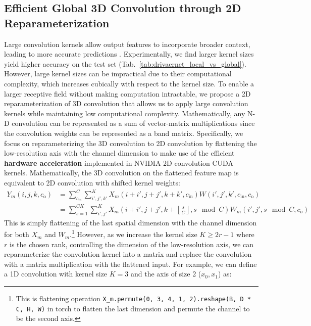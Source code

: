 \subsection{Efficient Global 3D Convolution through 2D Reparameterization}
\label{sec:reparameterization}

Large convolution kernels allow output features to incorporate broader context, leading to more accurate predictions \citep{peng2017large,huang2023large}.
Experimentally, we find larger kernel sizes yield higher accuracy on the test set (Tab.~\ref{tab:drivaernet_local_vs_global}).
However, large kernel sizes can be impractical due to their computational complexity, which increases cubically with respect to the kernel size.
To enable a larger receptive field without making computation intractable, we propose a 2D reparameterization of 3D convolution that allows us to apply large convolution kernels while maintaining low computational complexity.
Mathematically, any N-D convolution can be represented as a sum of vector-matrix multiplications since the convolution weights can be represented as a band matrix.
Specifically, we focus on reparameterizing the 3D convolution to 2D convolution by flattening the low-resolution axis with the channel dimension to make use of the efficient \textbf{hardware acceleration} implemented in NVIDIA 2D convolution CUDA kernels.
Mathematically, the 3D convolution on the flattened feature map is equivalent to 2D convolution with shifted kernel weights:
\begin{align}
Y_m(i,j,k,c_\text{o}) & = \sum_{c_\text{in}}^{C} \sum_{i',j',k'}^{K} X_m(i+i',j+j',k+k',c_\text{in})W(i',j',k',c_\text{in},c_\text{o}) \\
& = \sum_{s=1}^{CK} \sum_{i',j'}^{K} X_m(i + i', j + j', k + \left\lfloor \frac{s}{C}\right\rfloor,s\mod C)W_m(i',j',s \mod C,c_{o})
\end{align}
This is simply flattening of the last spatial dimension with the channel dimension for both $X_m$ and $W_m$.\footnote{This is flattening operation \texttt{X\_m.permute(0, 3, 4, 1, 2).reshape(B, D * C, H, W)} in torch to flatten the last dimension and permute the channel to be the second axis.}
However, as we increase the kernel size $K \ge 2r - 1$ where $r$ is the chosen rank, controlling the dimension of the low-resolution axis, we can reparameterize the convolution kernel into a matrix and replace the convolution with a matrix multiplication with the flattened input.
For example, we can define a 1D convolution with kernel size $K=3$ and the axis of size 2 ($x_0, x_1$) as:
